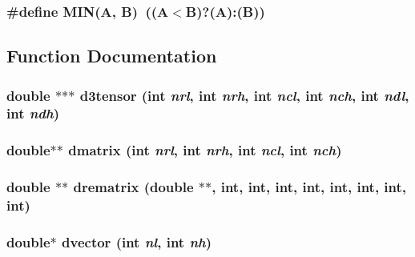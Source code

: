 \subsubsection{\setlength{\rightskip}{0pt plus 5cm}\#define MIN(A, B)~((A$<$B)?(A):(B))}\label{dmatrix_8c_dcd021ac91d43a62b2cdecf9a5b971a7}




\subsection{Function Documentation}
\subsubsection{\setlength{\rightskip}{0pt plus 5cm}double $\ast$$\ast$$\ast$ d3tensor (int {\em nrl}, int {\em nrh}, int {\em ncl}, int {\em nch}, int {\em ndl}, int {\em ndh})}\label{dmatrix_8c_2d979fb34273362e83bdd8c9a0644bd1}


\subsubsection{\setlength{\rightskip}{0pt plus 5cm}double$\ast$$\ast$ dmatrix (int {\em nrl}, int {\em nrh}, int {\em ncl}, int {\em nch})}\label{dmatrix_8c_3298d346d951a0f093a90b251ff83981}


\subsubsection{\setlength{\rightskip}{0pt plus 5cm}double $\ast$$\ast$ drematrix (double $\ast$$\ast$, int, int, int, int, int, int, int, int)}\label{dmatrix_8c_fa37803c91af823a4b2a41cb07be2573}


\subsubsection{\setlength{\rightskip}{0pt plus 5cm}double$\ast$ dvector (int {\em nl}, int {\em nh})}\label{dmatrix_8c_50a6274883081fced51203fbfd455acc}


